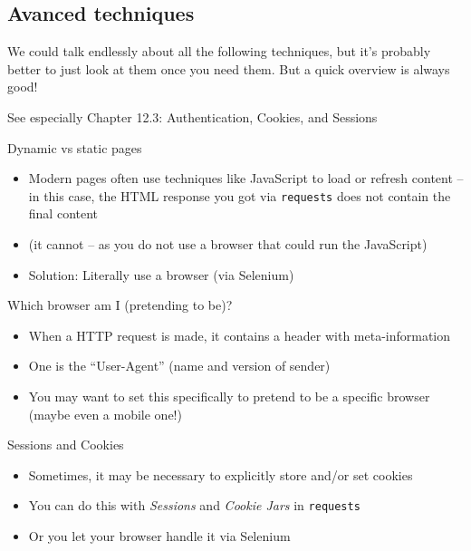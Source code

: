 \subsection{Avanced techniques}

\begin{frame}[standout]
We could talk endlessly about all the following techniques, but it's probably better to just look at them once you need them. But a quick overview is always good!
\end{frame}

\begin{frame}[standout]
See especially Chapter 12.3: Authentication, Cookies, and Sessions
\end{frame}

\begin{frame}{Dynamic vs static pages}
  \begin{itemize}
  \item Modern pages often use techniques like JavaScript to load or refresh content -- in this case, the HTML response you got via \texttt{requests} does not contain the final content
  \item (it cannot -- as you do not use a browser that could run the JavaScript)
  \item Solution: Literally use a browser (via Selenium)
  \end{itemize}
\end{frame}



\begin{frame}{Which browser am I (pretending to be)?}
  \begin{itemize}
  \item When a HTTP request is made, it contains a header with meta-information
  \item One is the ``User-Agent'' (name and version of sender)
  \item You may want to set this specifically to pretend to be a specific browser (maybe even a mobile one!)
  \end{itemize}
\end{frame}



\begin{frame}{Sessions and Cookies}
  \begin{itemize}
  \item Sometimes, it may be necessary to explicitly store and/or set cookies
  \item You can do this with \emph{Sessions} and \emph{Cookie Jars} in \texttt{requests}
  \item Or you let your browser handle it via Selenium
  \end{itemize}
\end{frame}

